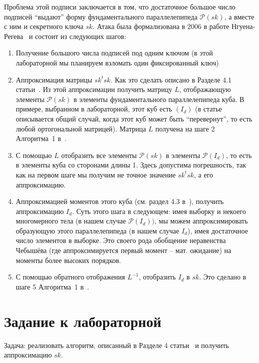 \documentclass[11pt]{exam}
\theoremstyle{definition}
\newcommand{\Id}{\ensuremath{I}}
\begin{document}
{	Проблема этой подписи заключается в том, что достаточное большое число подписей ``выдают'' форму фундаментального параллелепипеда $\mathcal{P}(sk)$, а вместе с ним и секретного ключа $sk$.  Атака была формализована в 2006 в работе Нгуена-Регева~\cite{NR06} и состоит из следующих шагов:
	\begin{enumerate}
		\item Получение большого числа подписей под одним ключом (в этой лабораторной мы планируем взломать один фиксированный ключ)
		\item Аппроксимация матрицы $sk^t sk$. Как это сделать описано в Разделе 4.1  статьи~\cite{NR06}. Из этой аппроксимации получить матрицу $L$, отображающую элементы $\mathcal{P}(sk)$ в элементы фундаментального параллелепипеда куба. В примере, выбранном в лабораторной, этот куб есть $(\Id_d)$ (в статье описывается общий случай, когда этот куб может быть ``перевернут'', то есть любой ортогональной матрицей).  Матрица $L$ получена на шаге 2 Алгоритма~1 в~\cite{NR06}.
		\item С помощью $L$ отобразить все элементы  $\mathcal{P}(sk)$  в элементы $\mathcal{P}(\Id_d)$, то есть в элементы куба со сторонами длины 1. Здесь допустима погрешность, так как на первом шаге мы получим не точное значение $sk^t sk$, а его аппроксимацию.
		\item Аппроксимацией моментов этого куба (см. раздел 4.3 в~\cite{NR06}), получить аппроксимацию $\Id_d$.
		Суть этого шага в следующем: имея выборку и некоего многомерного тела (в нашем случае $\mathcal{P}(\Id_d))$, мы можем аппроксимировать образующую этого параллелепипеда (в нашем случае $\Id_d$), имея достаточное число элементов в выборке. Это своего рода обобщение неравенства Чебышёва (где аппроксимируется первый момент -- мат. ожидание) на моменты более высоких порядков. 
		\item С помощью обратного отображения $L^{-1}$, отобразить $\Id_d$ в $sk$. Это сделано в шаге 5 Алгоритма~1 в~\cite{NR06}.
	\end{enumerate}
	

	\section{Задание к лабораторной}
	
	Задача: реализовать алгоритм, описанный в Разделе 4 статьи~\cite{NR06} и получить аппроксимацию $sk$.
	
}
\end{document}
